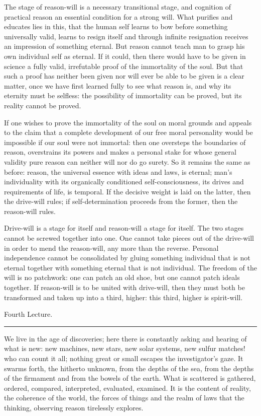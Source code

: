 \documentclass[12pt,a4paper,openany]{book}
\newcommand{\opage}[1]{\marginnote{\footnotesize\textit{[#1]}}}
\newcommand{\lecture}[1]{\clearpage\begin{center}{\large #1}\\[0.4em]\rule{3em}{0.4pt}\end{center}\medskip\noindent}
\begin{document}
The stage of reason-will is a necessary transitional stage, and cognition of practical reason an essential condition for a
strong will. What purifies and educates lies in this, that the human self learns to bow before something universally valid,
learns to resign itself and through infinite resignation receives an impression of something eternal. But reason cannot
teach man to grasp his own individual self as eternal. If it could, then there would have to be given in science a fully
valid, irrefutable proof of the immortality of the soul. But that such a proof has neither been given nor will ever be able
to be given is a clear matter, once we have first learned fully to see what reason is, and why its eternity must be selfless:
the possibility of immortality can be proved, but its reality cannot be proved.

If one wishes to prove the immortality of the soul on moral grounds and appeals to the claim that a complete development of
our free moral personality would be impossible if our soul were not immortal: then one oversteps the boundaries of reason,
overstrains its powers and makes a personal stake for whose general validity pure reason can neither will nor do go surety.
So it remains the same as before: reason, the universal essence with ideas and laws, is eternal; man's individuality with
its organically conditioned self-consciousness, its drives and requirements of life, is temporal. If the decisive weight is
laid on the latter,
\setcounter{footnote}{0}%
\opage{34}then the drive-will rules; if self-determination proceeds from the former, then the reason-will rules.

Drive-will is a stage for itself and reason-will a stage for itself. The two stages cannot be screwed together into one. One
cannot take pieces out of the drive-will in order to mend the reason-will, any more than the reverse. Personal independence
cannot be consolidated by gluing something individual that is not eternal together with something eternal that is not
individual. The freedom of the will is no patchwork: one can patch an old shoe, but one cannot patch ideals together. If
reason-will is to be united with drive-will, then they must both be transformed and taken up into a third, higher: this
third, higher is spirit-will.

\setcounter{footnote}{0}%
\lecture{Fourth Lecture.}\opage{35}

We live in the age of discoveries; here there is constantly asking and hearing of what is new: new machines, new stars, new
solar systems, new sulfur matches! who can count it all; nothing great or small escapes the investigator's gaze. It swarms
forth, the hitherto unknown, from the depths of the sea, from the depths of the firmament and from the bowels of the earth.
What is scattered is gathered, ordered, compared, interpreted, evaluated, examined. It is the content of reality, the
coherence of the world, the forces of things and the realm of laws that the thinking, observing reason tirelessly explores.
\end{document}
